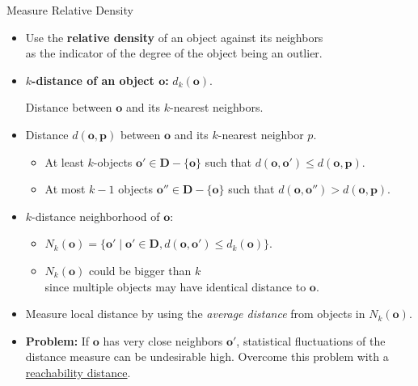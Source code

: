\begin{frame}{Measure Relative Density}
	\begin{itemize}
		\item Use the \textbf{relative density} of an object against its neighbors \\
		      as the indicator of the degree of the object being an outlier.
		\item \textbf{{\color{airforceblue}$k$-distance} of an object $\mathbf{o}$:} $d_k(\mathbf{o})$.

		      Distance between $\mathbf{o}$ and its $k$-nearest neighbors.
		\item Distance $d(\mathbf{o}, \mathbf{p})$ between $\mathbf{o}$ and its $k$-nearest neighbor $p$.
		      \begin{itemize}
			      \item At least $k$-objects $\textbf{o}' \in \mathbf{D} - \{\mathbf{o}\}$
			            such that $d(\mathbf{o}, \mathbf{o}') \leq d(\mathbf{o}, \mathbf{p})$.
			      \item At most $k-1$ objects $\mathbf{o}'' \in \mathbf{D} - \{\mathbf{o}\}$
			            such that $d(\mathbf{o}, \mathbf{o}'') > d(\mathbf{o}, \mathbf{p})$.
		      \end{itemize}
		\item $k$-distance neighborhood of $\mathbf{o}$:
		      \begin{itemize}
			      \item $N_k(\mathbf{o}) = \{\mathbf{o}' \; \vert \; \mathbf{o}' \in \mathbf{D}, d(\mathbf{o}, \mathbf{o}') \leq d_k(\mathbf{o})\}$.
			      \item $N_k(\mathbf{o})$ could be bigger than $k$ \\
			            since multiple objects may have identical distance to $\mathbf{o}$.
		      \end{itemize}
		\item Measure local distance by using the \textit{average distance} from objects in $N_k(\mathbf{o})$.
		\item \textbf{Problem:} If $\mathbf{o}$ has very close neighbors $\mathbf{o}'$, statistical fluctuations of the distance measure can be undesirable high. Overcome this problem with a \underline{reachability distance}.
	\end{itemize}
\end{frame}


